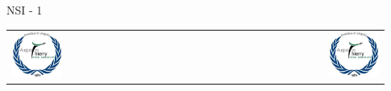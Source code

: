 \documentclass[12pt,oneside]{report}
\begin{document}
\begin{module}[colback=white]{NSI - 1\iere}
\vspace*{1em}
\begin{tabular}{m{0.15\linewidth}M{0.63\linewidth}R{0.15\linewidth}}
\includegraphics[width=\linewidth]{logo_augustin_thierry}
&
\textcolor{blue}{\LARGE {}}
&
\includegraphics[width=\linewidth]{logo_augustin_thierry}
\end{tabular}
\vspace*{0.2em}
\end{module}
\end{document}
